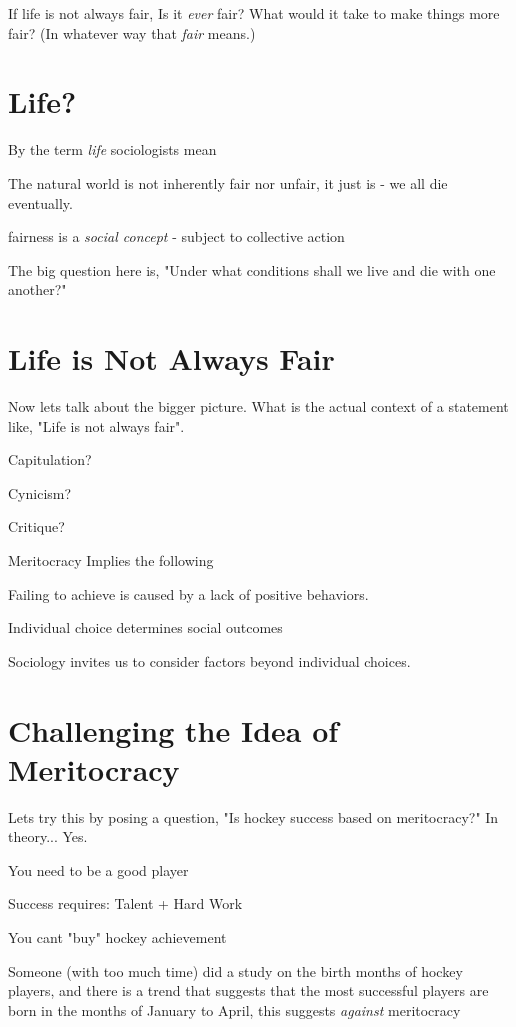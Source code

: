 If life is not always fair, Is it \emph{ever} fair? What would it take to make things more fair? (In whatever way that \emph{fair} means.)

\section{Life?}
By the term \emph{life} sociologists mean 
\begin{bullets}
	\item The natural world is not inherently fair nor unfair, it just is - we all die eventually.
	\item fairness is a \emph{social concept} - subject to collective action
\end{bullets}
The big question here is, "Under what conditions shall we live and die with one another?"

\section{Life is Not Always Fair}
Now lets talk about the bigger picture. What is the actual context of a statement like, "Life is not always fair".
\begin{bullets}
	\item Capitulation?
	\item Cynicism?
	\item Critique?
\end{bullets}

Meritocracy Implies the following
\begin{bullets}
	\item Failing to achieve is caused by a lack of positive behaviors.
	\item Individual choice determines social outcomes
\end{bullets}
Sociology invites us to consider factors beyond individual choices.

\section{Challenging the Idea of Meritocracy}
Lets try this by posing a question, "Is hockey success based on meritocracy?" In theory... Yes.
\begin{bullets}
	\item You need to be a good player
	\item Success requires: Talent + Hard Work
	\item You cant "buy" hockey achievement
\end{bullets}
Someone (with too much time) did a study on the birth months of hockey players, and there is a trend that suggests that the most successful players are born in the months of January to April, this suggests \emph{against} meritocracy

